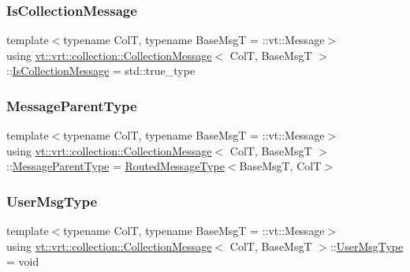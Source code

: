 \subsubsection{\texorpdfstring{Is\+Collection\+Message}{IsCollectionMessage}}
{\footnotesize\ttfamily template$<$typename ColT, typename Base\+MsgT = \+::vt\+::\+Message$>$ \\
using \hyperlink{structvt_1_1vrt_1_1collection_1_1_collection_message}{vt\+::vrt\+::collection\+::\+Collection\+Message}$<$ ColT, Base\+MsgT $>$\+::\hyperlink{structvt_1_1vrt_1_1collection_1_1_collection_message_a186fceb015a3415a482d99851432222b}{Is\+Collection\+Message} =  std\+::true\+\_\+type}

\mbox{\label{structvt_1_1vrt_1_1collection_1_1_collection_message_a889217019ccfbc6822138d2e007c53b4}} 
\subsubsection{\texorpdfstring{Message\+Parent\+Type}{MessageParentType}}
{\footnotesize\ttfamily template$<$typename ColT, typename Base\+MsgT = \+::vt\+::\+Message$>$ \\
using \hyperlink{structvt_1_1vrt_1_1collection_1_1_collection_message}{vt\+::vrt\+::collection\+::\+Collection\+Message}$<$ ColT, Base\+MsgT $>$\+::\hyperlink{structvt_1_1location_1_1_entity_msg_a186637100a628eb04cb00127f5579210}{Message\+Parent\+Type} =  \hyperlink{namespacevt_1_1vrt_1_1collection_a1bbc628be0955797f2d45227ee526346}{Routed\+Message\+Type}$<$Base\+MsgT, ColT$>$}

\mbox{\label{structvt_1_1vrt_1_1collection_1_1_collection_message_ace5b4eaa94f5b209ae321edd6c0b6c19}} 
\subsubsection{\texorpdfstring{User\+Msg\+Type}{UserMsgType}}
{\footnotesize\ttfamily template$<$typename ColT, typename Base\+MsgT = \+::vt\+::\+Message$>$ \\
using \hyperlink{structvt_1_1vrt_1_1collection_1_1_collection_message}{vt\+::vrt\+::collection\+::\+Collection\+Message}$<$ ColT, Base\+MsgT $>$\+::\hyperlink{structvt_1_1vrt_1_1collection_1_1_collection_message_ace5b4eaa94f5b209ae321edd6c0b6c19}{User\+Msg\+Type} =  void}



